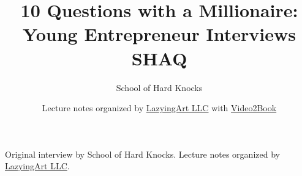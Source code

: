 \documentclass[11pt,oneside]{book}
\begin{document}
\frontmatter
\title{10 Questions with a Millionaire: Young Entrepreneur Interviews SHAQ}
\author{School of Hard Knocks}
\date{Lecture notes organized by \href{https://lazying.art}{LazyingArt LLC} with \href{https://github.com/lachlanchen/Video2Book}{Video2Book}}
\maketitle
\begin{center}
\small Original interview by School of Hard Knocks. Lecture notes organized by \href{https://lazying.art}{LazyingArt LLC}.
\end{center}
\clearpage
\mainmatter

\end{document}
